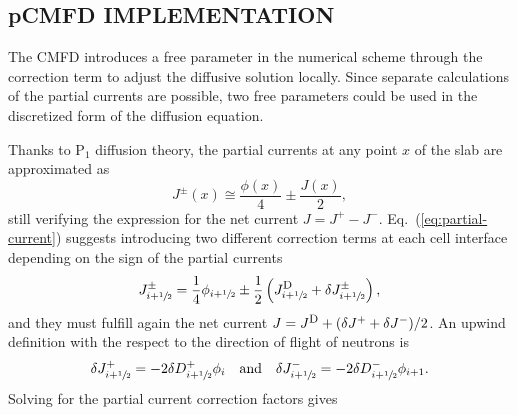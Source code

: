 \documentclass[letterpaper]{physor2020}
\newcommand{\eq}[1]{Eq.~(\ref{#1})}
\newcommand{\jp}{\ensuremath{J^+}}
\newcommand{\jm}{\ensuremath{J^-}}
\newcommand{\jpm}{\ensuremath{J^\pm}}
\newcommand{\jD}{\ensuremath{J^{\textrm{\scriptsize{D}}}}}
\newcommand{\hzi}{\ensuremath{\sfrac{1}{2}}}
\begin{document}
\subsection{pCMFD IMPLEMENTATION}
\label{sec:RM-pCMFD}

The CMFD introduces a free parameter in the numerical scheme through the correction term to adjust the diffusive solution locally. Since separate calculations of the partial currents are possible, two free parameters could be used in the discretized form of the diffusion equation.

Thanks to P$_1$ diffusion theory, the partial currents at any point $x$ of the slab are approximated as
\begin{equation}
\label{eq:partial-current}
\jpm(x) \cong \frac{\phi(x)}{4} \pm \frac{J (x)}{2},
\end{equation}
still verifying the expression for the net current $J = J^+ - J^-$.
\eq{eq:partial-current} suggests introducing two different correction terms at each cell interface depending on the sign of the partial currents
\begin{equation}
  \label{eq:PCCF}
  \jpm _{i+\hzi} = \frac{1}{4} \phi_{i+\hzi} \pm \frac{1}{2}
    \left(\jD_{i+\hzi} + \delta \jpm_{i+\hzi}\right),
\end{equation}
and they must fulfill again the net current $J = \jD + (\delta \jp + \delta \jm)/2$. An upwind definition with the respect to the direction of flight of neutrons is~\cite{Jarrett-2016,Zhu-2016}
\begin{equation}
\label{eq:CCF-sub}
\delta \jp _{i+\hzi} = -2\delta D^+ _{i+\hzi} \phi_i
\quad \text{and} \quad
\delta \jm _{i+\hzi} = -2\delta D^- _{i+\hzi} \phi_{i+1}.
\end{equation}
%
Solving for the partial current correction factors gives
\end{document}
